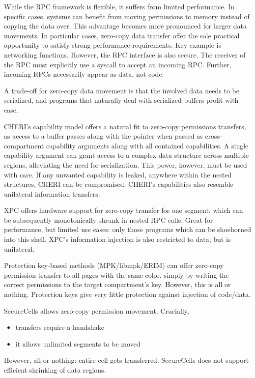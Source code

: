 While the RPC framework is flexible, it suffers from limited performance.
In specific cases, systems can benefit from moving permissions to memory
instead of copying the data over.
This advantage becomes more pronounced for larger data movements.
In particular cases, zero-copy data transfer offer the sole practical
opportunity to satisfy strong performance requirements. 
Key example is networking functions.
However, the RPC interface is also secure. 
The receiver of the RPC must explicitly use a syscall to accept an 
incoming RPC.
Further, incoming RPCs necessarily appear as data, not code.

A trade-off for zero-copy data movement is that the involved data needs
to be serialized, and programs that naturally deal with serialized buffers
profit with ease.

CHERI's capability model offers a natural fit to zero-copy permissions 
transfers, as access to a buffer passes along with the pointer when passed
as cross-compartment capability arguments along with all contained 
capabilities.
A single capability argument can grant access to a complex data structure
across multiple regions, alleviating the need for serialization.
This power, however, must be used with care.
If any unwanted capability is leaked, anywhere within the nested structures,
CHERI can be compromised.
CHERI's capabilities also resemble unilateral information transfers.

XPC offers hardware support for zero-copy transfer for one segment, which can
be subsequently monotonically shrunk in nested RPC calls.
Great for performance, but limited use cases: only those programs which can
be shoehorned into this shell.
XPC's information injection is also restricted to data, but is unilateral.

Protection key-based methods (MPK/libmpk/ERIM) can offer zero-copy permission
transfer to all pages with the same color, simply by writing the correct
permissions to the target compartment's key.
However, this is all or nothing.
Protection keys give very little protection against injection of code/data.

SecureCells allows zero-copy permission movement. 
Crucially, 
\begin{itemize}
      \item transfers require a handshake
      \item it allows unlimited segments to be moved
\end{itemize}
However, all or nothing: entire cell gets transferred.
SecureCells does not support efficient shrinking of data regions.



